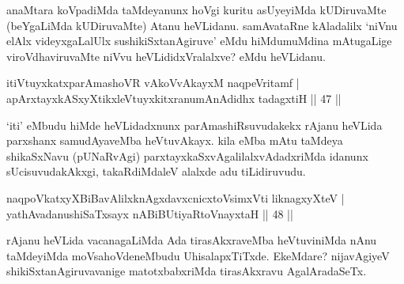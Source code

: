 \begin{artha}
anaMtara koVpadiMda taMdeyanunx hoVgi kuritu asUyeyiMda kUDiruvaMte 
(beYgaLiMda kUDiruvaMte) Atanu heVLidanu. samAvataRne kAladalilx 
`niVnu elAlx videyxgaLalUlx sushikiSxtanAgiruve' eMdu hiMdumuMdina 
mAtugaLige viroVdhaviruvaMte niVvu heVLididxVralalxve? eMdu heVLidanu.
\end{artha}


\begin{shl}
itiVtuyxkatxparAmashoVR \footnotemark[3]vAkoVvAkayxM naqpeVritamf | \\
\footnotemark[2]apArxtayxkASxyXtikxleVtuyxkitxranumAnAdidhx tadagxtiH \hfill|| 47 || 
\end{shl}

\begin{artha}
`iti' eMbudu hiMde heVLidadxnunx parAmashiRsuvudakekx rAjanu heVLida 
parxshanx samudAyaveMba heVtuvAkayx. kila eMba mAtu taMdeya 
shikaSxNavu (pUNaRvAgi) parxtayxkaSxvAgalilalxvAdadxriMda idanunx
sUcisuvudakAkxgi, takaRdiMdaleV alalxde adu tiLidiruvudu.
\end{artha}

\begin{shl}
naqpoVkatxyXBiBavAlilxknAgxdavxcnicxtoV\s simxVti liknagxyXteV | \\
yathAvadanushiSaTxsayx nABiBUtiyaRtoV\s nayxtaH \hfill|| 48 || 
\end{shl}

\begin{artha}
rAjanu heVLida vacanagaLiMda Ada tirasAkxraveMba heVtuviniMda 
nAnu taMdeyiMda moVsahoVdeneMbudu UhisalapxTiTxde. EkeMdare? 
nijavAgiyeV shikiSxtanAgiruvavanige matotxbabxriMda tirasAkxravu 
AgalAradaSeTx.
\end{artha}

